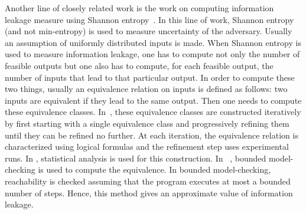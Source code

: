 Another line of closely related work is the work on computing information leakage measure using Shannon entropy~\cite{BackesKopf,Malacria07}. In this line of work, 
Shannon entropy (and not min-entropy) is used to measure uncertainty of the adversary. Usually an assumption of uniformly distributed inputs is made. When Shannon entropy is used to measure information leakage, one has to compute not only the number of feasible outputs but one also has to compute, for each feasible output,  the number of inputs that lead to that particular output. In order to compute these two things, usually an  equivalence relation on inputs is defined as follows: two inputs are equivalent if they lead to the same output. Then one needs to compute these equivalence classes. In~\cite{BackesKopf}, these equivalence classes are constructed iteratively by first starting with a single equivalence class and progressively refining them until they can be refined no further. At each iteration,   the equivalence relation is characterized using logical formulas and the refinement step uses experimental runs. In \cite{Kopf}, statistical analysis is used for this construction. In ~\cite{Malacria07}, bounded model-checking is used to compute the equivalence. In bounded model-checking, reachability is checked assuming that the program executes at most a bounded number of steps. Hence, this method gives an approximate value of information leakage. 

%
%
%
%
